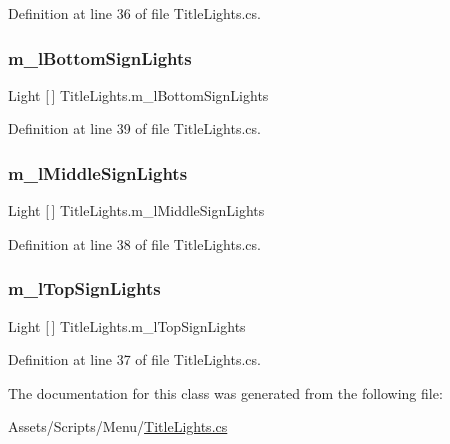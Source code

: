 Definition at line 36 of file Title\+Lights.\+cs.

\mbox{\label{class_title_lights_aed75f5c52bff664852103dbea27d34e9}} 
\subsubsection{\texorpdfstring{m\+\_\+l\+Bottom\+Sign\+Lights}{m\_lBottomSignLights}}
{\footnotesize\ttfamily Light \mbox{[}$\,$\mbox{]} Title\+Lights.\+m\+\_\+l\+Bottom\+Sign\+Lights}



Definition at line 39 of file Title\+Lights.\+cs.

\mbox{\label{class_title_lights_a9fd28d0f50d7274e564cc0f037da94a1}} 
\subsubsection{\texorpdfstring{m\+\_\+l\+Middle\+Sign\+Lights}{m\_lMiddleSignLights}}
{\footnotesize\ttfamily Light \mbox{[}$\,$\mbox{]} Title\+Lights.\+m\+\_\+l\+Middle\+Sign\+Lights}



Definition at line 38 of file Title\+Lights.\+cs.

\mbox{\label{class_title_lights_a212e3e0e32af765370d85dfccec60014}} 
\subsubsection{\texorpdfstring{m\+\_\+l\+Top\+Sign\+Lights}{m\_lTopSignLights}}
{\footnotesize\ttfamily Light \mbox{[}$\,$\mbox{]} Title\+Lights.\+m\+\_\+l\+Top\+Sign\+Lights}



Definition at line 37 of file Title\+Lights.\+cs.



The documentation for this class was generated from the following file\+:\begin{DoxyCompactItemize}
\item 
Assets/\+Scripts/\+Menu/\mbox{\hyperlink{_title_lights_8cs}{Title\+Lights.\+cs}}\end{DoxyCompactItemize}
